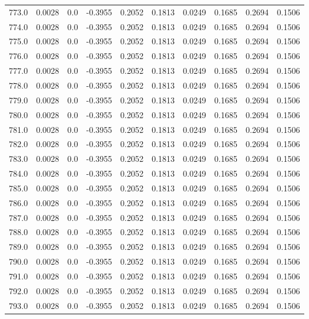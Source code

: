 \begin{longtable}{lrrrrrrrrr}
773.0 & 0.0028 & 0.0 & -0.3955 & 0.2052 & 0.1813 & 0.0249 & 0.1685 & 0.2694 & 0.1506 \\
774.0 & 0.0028 & 0.0 & -0.3955 & 0.2052 & 0.1813 & 0.0249 & 0.1685 & 0.2694 & 0.1506 \\
775.0 & 0.0028 & 0.0 & -0.3955 & 0.2052 & 0.1813 & 0.0249 & 0.1685 & 0.2694 & 0.1506 \\
776.0 & 0.0028 & 0.0 & -0.3955 & 0.2052 & 0.1813 & 0.0249 & 0.1685 & 0.2694 & 0.1506 \\
777.0 & 0.0028 & 0.0 & -0.3955 & 0.2052 & 0.1813 & 0.0249 & 0.1685 & 0.2694 & 0.1506 \\
778.0 & 0.0028 & 0.0 & -0.3955 & 0.2052 & 0.1813 & 0.0249 & 0.1685 & 0.2694 & 0.1506 \\
779.0 & 0.0028 & 0.0 & -0.3955 & 0.2052 & 0.1813 & 0.0249 & 0.1685 & 0.2694 & 0.1506 \\
780.0 & 0.0028 & 0.0 & -0.3955 & 0.2052 & 0.1813 & 0.0249 & 0.1685 & 0.2694 & 0.1506 \\
781.0 & 0.0028 & 0.0 & -0.3955 & 0.2052 & 0.1813 & 0.0249 & 0.1685 & 0.2694 & 0.1506 \\
782.0 & 0.0028 & 0.0 & -0.3955 & 0.2052 & 0.1813 & 0.0249 & 0.1685 & 0.2694 & 0.1506 \\
783.0 & 0.0028 & 0.0 & -0.3955 & 0.2052 & 0.1813 & 0.0249 & 0.1685 & 0.2694 & 0.1506 \\
784.0 & 0.0028 & 0.0 & -0.3955 & 0.2052 & 0.1813 & 0.0249 & 0.1685 & 0.2694 & 0.1506 \\
785.0 & 0.0028 & 0.0 & -0.3955 & 0.2052 & 0.1813 & 0.0249 & 0.1685 & 0.2694 & 0.1506 \\
786.0 & 0.0028 & 0.0 & -0.3955 & 0.2052 & 0.1813 & 0.0249 & 0.1685 & 0.2694 & 0.1506 \\
787.0 & 0.0028 & 0.0 & -0.3955 & 0.2052 & 0.1813 & 0.0249 & 0.1685 & 0.2694 & 0.1506 \\
788.0 & 0.0028 & 0.0 & -0.3955 & 0.2052 & 0.1813 & 0.0249 & 0.1685 & 0.2694 & 0.1506 \\
789.0 & 0.0028 & 0.0 & -0.3955 & 0.2052 & 0.1813 & 0.0249 & 0.1685 & 0.2694 & 0.1506 \\
790.0 & 0.0028 & 0.0 & -0.3955 & 0.2052 & 0.1813 & 0.0249 & 0.1685 & 0.2694 & 0.1506 \\
791.0 & 0.0028 & 0.0 & -0.3955 & 0.2052 & 0.1813 & 0.0249 & 0.1685 & 0.2694 & 0.1506 \\
792.0 & 0.0028 & 0.0 & -0.3955 & 0.2052 & 0.1813 & 0.0249 & 0.1685 & 0.2694 & 0.1506 \\
793.0 & 0.0028 & 0.0 & -0.3955 & 0.2052 & 0.1813 & 0.0249 & 0.1685 & 0.2694 & 0.1506 \\

\end{longtable}

